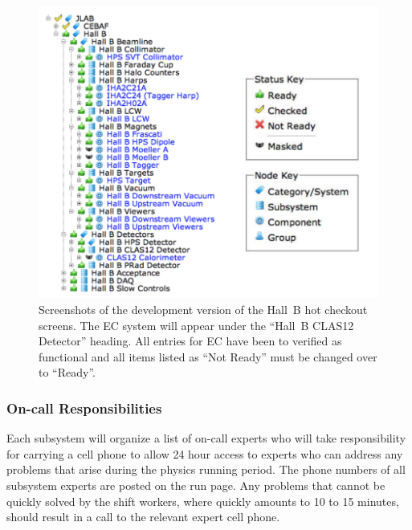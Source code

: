 \documentclass[letterpaper,10pt]{article}
\begin{document}
\begin{figure}[htbp]
  \centering
  \includegraphics[width= 7in, keepaspectratio = true]{Hot-checkout}
  \vspace{2mm}
\caption{Screenshots of the development version of the Hall~B hot checkout screens. The EC system
will appear under the ``Hall~B CLAS12 Detector'' heading. All entries for EC have been to verified
as functional and all items listed as ``Not Ready'' must be changed over to ``Ready''.}
\label{hot-co}
\end{figure}

\subsubsection{On-call Responsibilities}
\label{oncall}

Each subsystem will organize a list of on-call experts who will take responsibility for carrying
a cell phone to allow 24 hour access to experts who can address any problems that arise during
the physics running period. The phone numbers of all subsystem experts are posted on the run page. 
Any problems that cannot be quickly solved by the shift workers, where quickly amounts to 10 to 15 
minutes, should result in a call to the relevant expert cell phone. 
\end{document}
